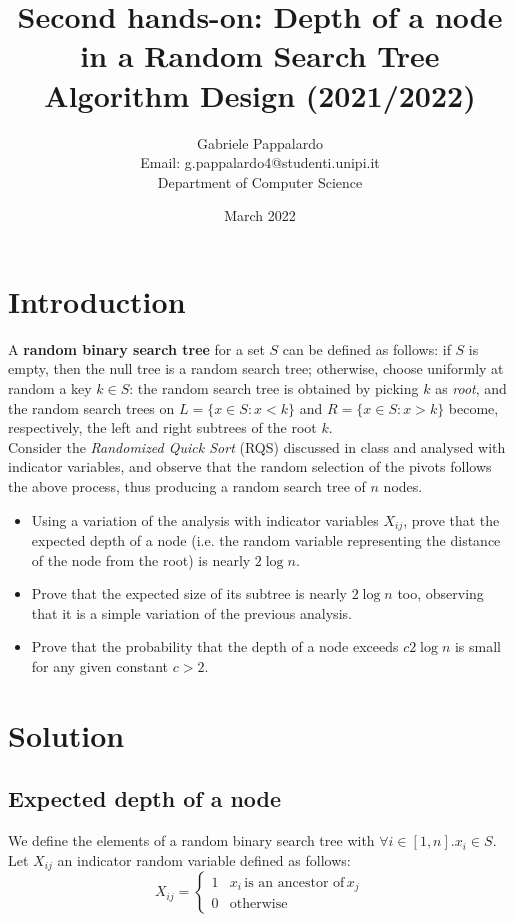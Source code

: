 \documentclass{article}
\title{Second hands-on: Depth of a node in a Random Search Tree\\[1ex] \large Algorithm Design (2021/2022)}
\author{Gabriele Pappalardo\\Email: g.pappalardo4@studenti.unipi.it\\Department of Computer Science}
\date{March 2022}
\begin{document}
\maketitle

\section{Introduction}

A \textbf{random binary search tree} for a set $S$ can be defined as follows: if $S$ is empty, then the null tree is a random search tree; otherwise, choose uniformly at random a key $k \in S$: the random search tree is obtained by picking $k$ as \textit{root}, and the random search trees on $L = \{x \in S : x < k\}$ and $R = \{x \in S : x > k\}$ become, respectively, the left and right subtrees of the root $k$.\\

\noindent Consider the \textit{Randomized Quick Sort} (RQS) discussed in class and analysed with indicator variables, and observe that the random selection of the pivots follows the above process, thus producing a random search tree of $n$ nodes.\\

\begin{itemize}
    \item Using a variation of the analysis with indicator variables $X_{ij}$, prove that the expected depth of a node (i.e. the random variable representing the distance of the node from the root) is nearly $2 \log n$. 
    \item Prove that the expected size of its subtree is nearly $2 \log n$ too, observing that it is a simple variation of the previous analysis.
    \item Prove that the probability that the depth of a node exceeds $c2 \log n$ is small for any given constant $c > 2$. 
\end{itemize}

\section{Solution}

\subsection{Expected depth of a node}

We define the elements of a random binary search tree with $\forall i \in [1, n] . x_i \in S$. Let $X_{ij}$ an indicator random variable defined as follows:
\begin{equation}
    X_{ij} = \begin{cases}
    1 & x_i \, \textrm{is an ancestor of} \, x_j\\
    0 & \textrm{otherwise}
    \end{cases}
\end{equation}
\end{document}
